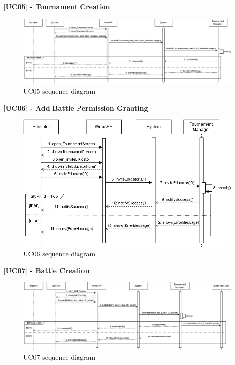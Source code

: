\newpage

\textbf{[UC05] - Tournament Creation}
\begin{figure}[H]
    \centering
    \includegraphics[width=1\linewidth]{Images/SD_TournamentCreation.png}
    \caption{UC05 sequence diagram}
    \label{fig:uc05}
\end{figure}

\textbf{[UC06] - Add Battle Permission Granting}
\begin{figure}[H]
    \centering
    \includegraphics[width=1\linewidth]{Images/SD_AddBattlePermission.png}
    \caption{UC06 sequence diagram}
    \label{fig:uc06}
\end{figure}

\newpage

\textbf{[UC07] - Battle Creation}
\begin{figure}[H]
    \centering
    \includegraphics[width=1\linewidth]{Images/SD_BattleCreation.png}
    \caption{UC07 sequence diagram}
    \label{fig:uc07}
\end{figure}

